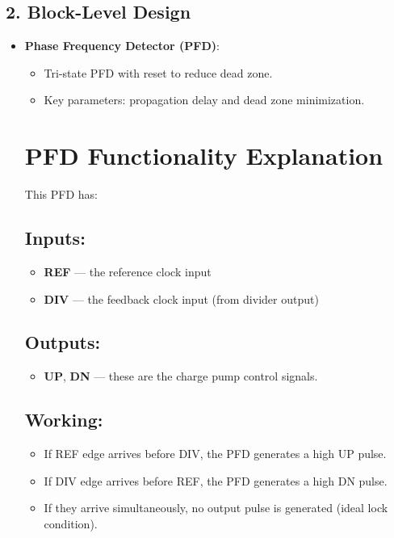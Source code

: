 \subsection*{2. Block-Level Design}
\begin{itemize}
    \item \textbf{Phase Frequency Detector (PFD)}:
    \begin{itemize}
        \item Tri-state PFD with reset to reduce dead zone.
        \item Key parameters: propagation delay and dead zone minimization.
    \end{itemize}
\section*{PFD Functionality Explanation}

This PFD has:

\subsection*{Inputs:}
\begin{itemize}
    \item \textbf{REF} — the reference clock input
    \item \textbf{DIV} — the feedback clock input (from divider output)
\end{itemize}

\subsection*{Outputs:}
\begin{itemize}
    \item \textbf{UP}, \textbf{DN} — these are the charge pump control signals.
\end{itemize}

\subsection*{Working:}
\begin{itemize}
    \item If REF edge arrives before DIV, the PFD generates a high UP pulse.
    \item If DIV edge arrives before REF, the PFD generates a high DN pulse.
    \item If they arrive simultaneously, no output pulse is generated (ideal lock condition).
\end{itemize}


\end{itemize}
